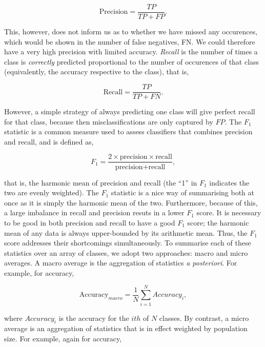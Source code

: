 \begin{equation}
\text{Precision} = \frac{TP}{TP + FP}.
\label{eq:precision}
\end{equation}

This, however, does not inform us as to whether we have missed any occurences, which would be shown in the number of false negatives, FN. We could therefore have a very high precision with limited accuracy. \emph{Recall} is the number of times a class is \emph{correctly} predicted proportional to the number of occurences of that class (equivalently, the accuracy respective to the class), that is,

\begin{equation}
\text{Recall} = \frac{TP}{TP + FN}.
\label{eq:recall}
\end{equation}

However, a simple strategy of always predicting one class will give perfect recall for that class, because then misclassifications are only captured by $FP$. The $F_1$ statistic is a common measure used to assess classifiers that combines precision and recall, and is defined as,

\begin{equation}
F_1 = \frac{2 \times \text{precision} \times \text{recall}}{\text{precision} + \text{recall}},
\label{eq:f1}
\end{equation}

that is, the harmonic mean of precision and recall (the ``1'' in $F_1$ indicates the two are evenly weighted). The $F_1$ statistic is a nice way of summarising both at once as it is simply the harmonic mean of the two. Furthermore, because of this, a large imbalance in recall and precision resuts in a lower $F_1$ score. It is necessary to be good in both precision and recall to have a good $F_1$ score; the harmonic mean of any data is always upper-bounded by its arithmetic mean. Thus, the $F_1$ score addresses their shortcomings simultaneously. To summarise each of these statistics over an array of classes, we adopt two approaches: macro and micro averages. A macro average is the aggregation of statistics \emph{a posteriori}. For example, for accuracy,

\begin{equation}
\text{Accuracy}_{macro} = \frac{1}{N}\sum_{i=1}^{N}Accuracy_i,
\label{eq:macroaccuracy}
\end{equation}

where $Accuracy_i$ is the accuracy for the $ith$ of $N$ classes. By contrast, a micro average is an aggregation of statistics that is in effect weighted by population size. For example, again for accuracy,

